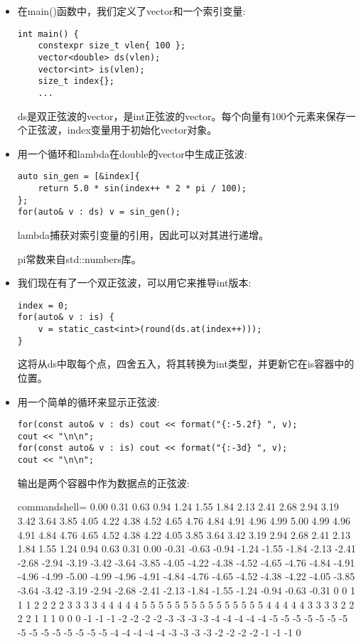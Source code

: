 \begin{itemize}
\item 
在main()函数中，我们定义了vector和一个索引变量:

\begin{lstlisting}[style=styleCXX]
int main() {
	constexpr size_t vlen{ 100 };
	vector<double> ds(vlen);
	vector<int> is(vlen);
	size_t index{};
	...
\end{lstlisting}

ds是双正弦波的vector，是int正弦波的vector。每个向量有100个元素来保存一个正弦波，index变量用于初始化vector对象。

\item 
用一个循环和lambda在double的vector中生成正弦波:

\begin{lstlisting}[style=styleCXX]
auto sin_gen = [&index]{
	return 5.0 * sin(index++ * 2 * pi / 100);
};
for(auto& v : ds) v = sin_gen();
\end{lstlisting}

lambda捕获对索引变量的引用，因此可以对其进行递增。

pi常数来自std::numbers库。

\item 
我们现在有了一个双正弦波，可以用它来推导int版本:

\begin{lstlisting}[style=styleCXX]
index = 0;
for(auto& v : is) {
	v = static_cast<int>(round(ds.at(index++)));
}
\end{lstlisting}

这将从ds中取每个点，四舍五入，将其转换为int类型，并更新它在is容器中的位置。

\item 
用一个简单的循环来显示正弦波:

\begin{lstlisting}[style=styleCXX]
for(const auto& v : ds) cout << format("{:-5.2f} ", v);
cout << "\n\n";
for(const auto& v : is) cout << format("{:-3d} ", v);
cout << "\n\n";
\end{lstlisting}

输出是两个容器中作为数据点的正弦波:

\begin{tcblisting}{commandshell={}}
0.00 0.31 0.63 0.94 1.24 1.55 1.84 2.13 2.41
2.68 2.94 3.19 3.42 3.64 3.85 4.05 4.22 4.38
4.52 4.65 4.76 4.84 4.91 4.96 4.99 5.00 4.99
4.96 4.91 4.84 4.76 4.65 4.52 4.38 4.22 4.05
3.85 3.64 3.42 3.19 2.94 2.68 2.41 2.13 1.84
1.55 1.24 0.94 0.63 0.31 0.00 -0.31 -0.63 -0.94
-1.24 -1.55 -1.84 -2.13 -2.41 -2.68 -2.94 -3.19 -3.42
-3.64 -3.85 -4.05 -4.22 -4.38 -4.52 -4.65 -4.76 -4.84
-4.91 -4.96 -4.99 -5.00 -4.99 -4.96 -4.91 -4.84 -4.76
-4.65 -4.52 -4.38 -4.22 -4.05 -3.85 -3.64 -3.42 -3.19
-2.94 -2.68 -2.41 -2.13 -1.84 -1.55 -1.24 -0.94 -0.63
-0.31
0 0 1 1 1 2 2 2 2 3 3 3 3 4 4
4 4 4 5 5 5 5 5 5 5 5 5 5 5 5
5 5 5 4 4 4 4 4 3 3 3 3 2 2 2
2 1 1 1 0 0 0 -1 -1 -1 -2 -2 -2 -2 -3
-3 -3 -3 -4 -4 -4 -4 -4 -5 -5 -5 -5 -5 -5
-5 -5 -5 -5 -5 -5 -5 -5 -5 -4 -4 -4 -4 -4
-3 -3 -3 -3 -2 -2 -2 -2 -1 -1 -1 0
\end{tcblisting}


\end{itemize}

